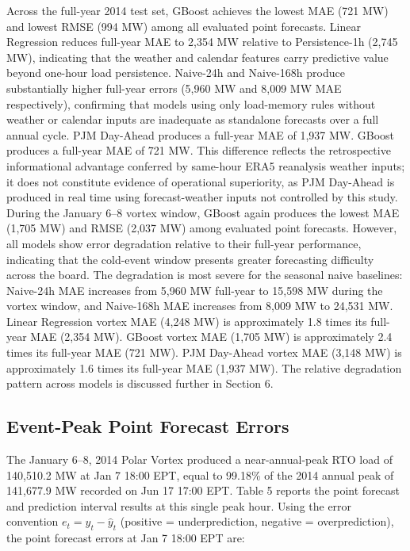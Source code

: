 \documentclass[12pt,a4paper]{article}
\begin{document}
Across the full-year 2014 test set, GBoost achieves the lowest MAE (721 MW) and lowest RMSE (994 MW) among all evaluated point forecasts. Linear Regression reduces full-year MAE to 2,354 MW relative to Persistence-1h (2,745 MW), indicating that the weather and calendar features carry predictive value beyond one-hour load persistence. Naive-24h and Naive-168h produce substantially higher full-year errors (5,960 MW and 8,009 MW MAE respectively), confirming that models using only load-memory rules without weather or calendar inputs are inadequate as standalone forecasts over a full annual cycle.
PJM Day-Ahead produces a full-year MAE of 1,937 MW. GBoost produces a full-year MAE of 721 MW. This difference reflects the retrospective informational advantage conferred by same-hour ERA5 reanalysis weather inputs; it does not constitute evidence of operational superiority, as PJM Day-Ahead is produced in real time using forecast-weather inputs not controlled by this study.
During the January 6–8 vortex window, GBoost again produces the lowest MAE (1,705 MW) and RMSE (2,037 MW) among evaluated point forecasts. However, all models show error degradation relative to their full-year performance, indicating that the cold-event window presents greater forecasting difficulty across the board. The degradation is most severe for the seasonal naive baselines: Naive-24h MAE increases from 5,960 MW full-year to 15,598 MW during the vortex window, and Naive-168h MAE increases from 8,009 MW to 24,531 MW. Linear Regression vortex MAE (4,248 MW) is approximately 1.8 times its full-year MAE (2,354 MW). GBoost vortex MAE (1,705 MW) is approximately 2.4 times its full-year MAE (721 MW). PJM Day-Ahead vortex MAE (3,148 MW) is approximately 1.6 times its full-year MAE (1,937 MW). The relative degradation pattern across models is discussed further in Section 6.


\subsection{Event-Peak Point Forecast Errors}
The January 6–8, 2014 Polar Vortex produced a near-annual-peak RTO load of 140,510.2 MW at Jan 7 18:00 EPT, equal to 99.18\% of the 2014 annual peak of 141,677.9 MW recorded on Jun 17 17:00 EPT. Table 5 reports the point forecast and prediction interval results at this single peak hour.
Using the error convention $e_t = y_t - \hat{y}_t$ (positive = underprediction, negative = overprediction), the point forecast errors at Jan 7 18:00 EPT are:
\end{document}
